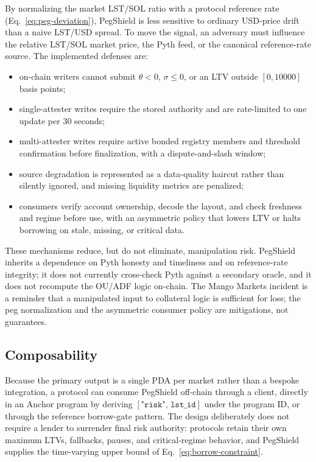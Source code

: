 \documentclass[aps,prx,reprint,nofootinbib,longbibliography]{revtex4-2}
\begin{document}
By normalizing the market LST/SOL ratio with a protocol reference rate
(Eq.~\eqref{eq:peg-deviation}), PegShield is less sensitive to ordinary USD-price
drift than a naive LST/USD spread. To move the signal, an adversary must influence
the relative LST/SOL market price, the Pyth feed, or the canonical reference-rate
source. The implemented defenses are:
\begin{itemize}
\item on-chain writers cannot submit $\theta<0$, $\sigma\leq 0$, or an LTV outside
$[0,10000]$ basis points;
\item single-attester writes require the stored authority and are rate-limited to
one update per 30 seconds;
\item multi-attester writes require active bonded registry members and threshold
confirmation before finalization, with a dispute-and-slash window;
\item source degradation is represented as a data-quality haircut rather than
silently ignored, and missing liquidity metrics are penalized;
\item consumers verify account ownership, decode the layout, and check freshness
and regime before use, with an asymmetric policy that lowers LTV or halts borrowing
on stale, missing, or critical data.
\end{itemize}
These mechanisms reduce, but do not eliminate, manipulation risk. PegShield
inherits a dependence on Pyth honesty and timeliness
\cite{pyth2022whitepaper,eskandari2021sok} and on reference-rate integrity; it does
not currently cross-check Pyth against a secondary oracle, and it does not recompute
the OU/ADF logic on-chain. The Mango Markets incident \cite{rekt_mango_2022} is a
reminder that a manipulated input to collateral logic is sufficient for loss; the
peg normalization and the asymmetric consumer policy are mitigations, not
guarantees.

\subsection{Composability}

Because the primary output is a single PDA per market rather than a bespoke
integration, a protocol can consume PegShield off-chain through a client, directly
in an Anchor program by deriving $[\texttt{"risk"},\,\texttt{lst\_id}]$ under the
program ID, or through the reference borrow-gate pattern. The design deliberately
does not require a lender to surrender final risk authority: protocols retain their
own maximum LTVs, fallbacks, pauses, and critical-regime behavior, and PegShield
supplies the time-varying upper bound of Eq.~\eqref{eq:borrow-constraint}.
\end{document}
